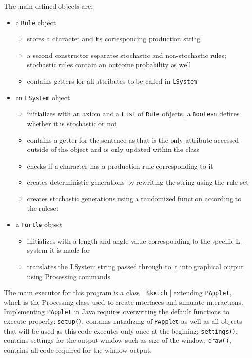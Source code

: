 \documentclass[]{final_report}
\begin{document}
The main defined objects are:
\begin{itemize}
    \item a \verb|Rule| object
    \begin{itemize}
        \item stores a character and its corresponding production string
        \item a second constructor separates stochastic and non-stochastic rules; stochastic rules contain an outcome probability as well
        \item contains getters for all attributes to be called in \verb|LSystem|
    \end{itemize}
    \item an \verb|LSystem| object
    \begin{itemize}
        \item initializes with an axiom and a \verb|List| of \verb|Rule| objects, a \verb|Boolean| defines whether it is stochastic or not
        \item contains a getter for the sentence as that is the only attribute accessed outside of the object and is only updated within the class
        \item checks if a character has a production rule corresponding to it
        \item creates deterministic generations by rewriting the string using the rule set
        \item creates stochastic generations using a randomized function according to the ruleset
    \end{itemize}
    \item a \verb|Turtle| object
    \begin{itemize}
        \item initializes with a length and angle value corresponding to the specific L-system it is made for
        \item translates the LSystem string passed through to it into graphical output using Processing commands
    \end{itemize}
\end{itemize}

The main executor for this program is a class | \verb|Sketch| | extending \verb|PApplet|, which is the Processing class used to create interfaces and simulate interactions. Implementing \verb|PApplet| in Java requires overwriting the default functions to execute properly: \verb|setup()|, contains initializing of \verb|PApplet| as well as all objects that will be used as this code executes only once at the begining; \verb|settings()|, contains settings for the output window such as size of the window; \verb|draw()|, contains all code required for the window output.
\end{document}
